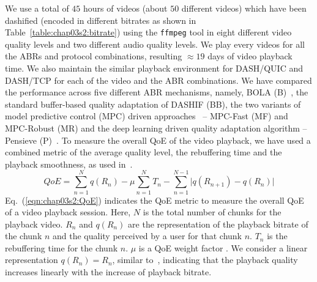We use a total of $45$ hours of videos (about $50$ different videos) which have been dashified (encoded in different bitrates as shown in Table~\ref{table:chap03s2:bitrate}) using the {\tt ffmpeg} tool in eight different video quality levels and two different audio quality levels. We play every videos for all the ABRs and protocol combinations, resulting $\approx 19$ days of video playback time. We also maintain the similar playback environment for DASH/QUIC and DASH/TCP for each of the video and the ABR combinations. 
We have compared the performance across five different ABR mechanisms, namely, BOLA (B)~\cite{Spiteri2016}, the standard buffer-based quality adaptation of DASHIF (BB), the two variants of model predictive control (MPC) driven approaches~\cite{yin2015control} -- MPC-Fast (MF) and MPC-Robust (MR) and the deep learning driven quality adaptation algorithm -- Pensieve (P)~\cite{mao2017neural}. To measure the overall QoE of the video playback, we have used a combined metric of the average quality level, the rebuffering time and the playback smoothness, as used in~\cite{yin2015control,mao2017neural}.
\begin{equation}
QoE=\sum_{n=1}^{N}q(R_n)-\mu\sum_{n=1}^{N}T_n-\sum_{n=1}^{N-1} \bigg\vert q(R_{n+1})-q(R_n)  \bigg\vert
\label{eqn:chap03s2:QoE}
\end{equation}
Eq.~(\ref{eqn:chap03s2:QoE}) indicates the QoE metric to measure the overall QoE of a video playback session. Here, $N$ is the total number of chunks for the playback video. $R_n$ and $q(R_n)$ are the representation of the playback bitrate of the chunk $n$ and the quality perceived by a user for that chunk $n$. $T_n$ is the rebuffering time for the chunk $n$. $\mu$ is a QoE weight factor \cite{yin2015control}.
We consider a linear representation $q(R_n) = R_n$, similar to~\cite{yin2015control}, indicating that the playback quality increases linearly with the increase of playback bitrate.
